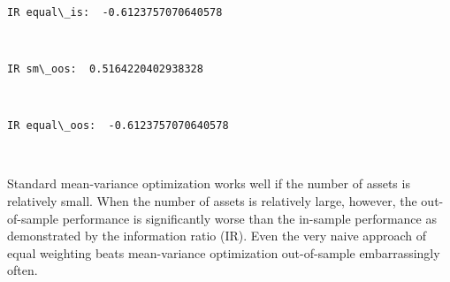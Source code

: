 \documentclass[11pt]{article}
\begin{document}
    \begin{center}
    \end{center}
    { \hspace*{\fill} \\}
    
    \begin{Verbatim}[commandchars=\\\{\},fontsize=\footnotesize]
IR equal\_is:  -0.6123757070640578

    \end{Verbatim}

    \begin{center}
    \end{center}
    { \hspace*{\fill} \\}
    
    \begin{Verbatim}[commandchars=\\\{\},fontsize=\footnotesize]
IR sm\_oos:  0.5164220402938328

    \end{Verbatim}

    \begin{center}
    \end{center}
    { \hspace*{\fill} \\}
    
    \begin{Verbatim}[commandchars=\\\{\},fontsize=\footnotesize]
IR equal\_oos:  -0.6123757070640578

    \end{Verbatim}

    \begin{center}
    \end{center}
    { \hspace*{\fill} \\}
    
    Standard mean-variance optimization works well if the number of assets
is relatively small. When the number of assets is relatively large,
however, the out-of-sample performance is significantly worse than the
in-sample performance as demonstrated by the information ratio (IR).
Even the very naive approach of equal weighting beats mean-variance
optimization out-of-sample embarrassingly often.
\end{document}
